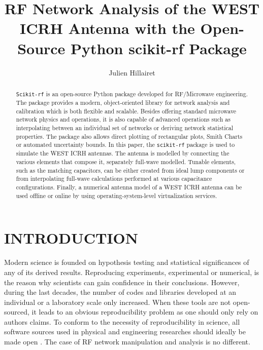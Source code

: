 \documentclass{aip-cp}
\begin{document}
\title{RF Network Analysis of the WEST ICRH Antenna with the Open-Source Python scikit-rf Package}

\author[IRFM]{Julien Hillairet}

\maketitle


\begin{abstract}
\texttt{Scikit-rf} is an open-source Python package developed for RF/Microwave engineering. The package provides a modern, object-oriented library for network analysis and calibration which is both flexible and scalable. Besides offering standard microwave network physics and operations, it is also capable of advanced operations such as interpolating between an individual set of networks or deriving network statistical properties. The package also allows direct plotting of rectangular plots, Smith Charts or automated uncertainty bounds. In this paper, the \texttt{scikit-rf} package is used to simulate the WEST ICRH antennas. The antenna is modelled by connecting the various elements that compose it, separately full-wave modelled. Tunable elements, such as the matching capacitors, can be either created from ideal lump components or from interpolating full-wave calculations performed at various capacitance configurations. Finally, a numerical antenna model of a WEST ICRH antenna can be used offline or online by using operating-system-level virtualization services. 
\end{abstract}


\section{INTRODUCTION}
Modern science is founded on hypothesis testing and statistical significances of any of its derived results. Reproducing experiments, experimental or numerical, is the reason why scientists can gain confidence in their conclusions. However, during the last decades, the number of codes and libraries developed at an individual or a laboratory scale only increased. When these tools are not open-sourced, it leads to an obvious reproducibility problem as one should only rely on authors claims. To conform to the necessity of reproducibility in science, all software sources used in physical and engineering researches should ideally be made open \cite{Ince2012}. The case of RF network manipulation and analysis is no different. 
\end{document}
